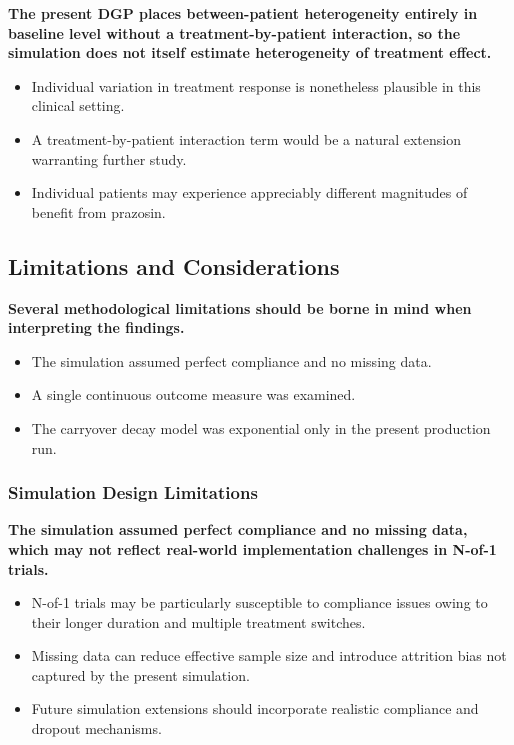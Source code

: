 \documentclass[
  11pt,
]{article}
\newcounter{none} %
\begin{document}
\textbf{The present DGP places between-patient heterogeneity entirely in baseline level without a treatment-by-patient interaction, so the simulation does not itself estimate heterogeneity of treatment effect.}

\begin{itemize}\setlength{\itemsep}{2pt}\setlength{\parskip}{0pt}
\item Individual variation in treatment response is nonetheless plausible in this clinical setting.
\item A treatment-by-patient interaction term would be a natural extension warranting further study.
\item Individual patients may experience appreciably different magnitudes of benefit from prazosin.
\end{itemize}

\subsection{Limitations and Considerations}\label{limitations-and-considerations}

\textbf{Several methodological limitations should be borne in mind when interpreting the findings.}

\begin{itemize}\setlength{\itemsep}{2pt}\setlength{\parskip}{0pt}
\item The simulation assumed perfect compliance and no missing data.
\item A single continuous outcome measure was examined.
\item The carryover decay model was exponential only in the present production run.
\end{itemize}

\subsubsection{Simulation Design Limitations}\label{simulation-design-limitations}

\textbf{The simulation assumed perfect compliance and no missing data, which may not reflect real-world implementation challenges in N-of-1 trials.}

\begin{itemize}\setlength{\itemsep}{2pt}\setlength{\parskip}{0pt}
\item N-of-1 trials may be particularly susceptible to compliance issues owing to their longer duration and multiple treatment switches.
\item Missing data can reduce effective sample size and introduce attrition bias not captured by the present simulation.
\item Future simulation extensions should incorporate realistic compliance and dropout mechanisms.
\end{itemize}
\end{document}
